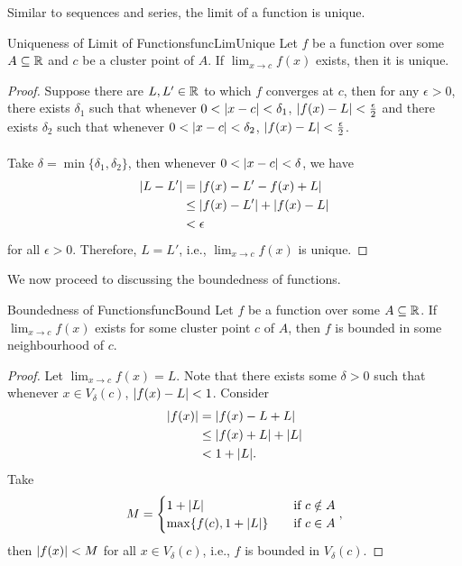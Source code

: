\documentclass[math]{amznotes}
\theoremstyle{remark}
\begin{document}
Similar to sequences and series, the limit of a function is unique.
\begin{thmbox}{Uniqueness of Limit of Functions}{funcLimUnique}
    Let $f$ be a function over some $A \subseteq \mathbb{R}$ and $c$ be a cluster point of $A$. If $\lim_{x \to c}f(x)$ exists, then it is unique.
    \tcblower
    \begin{proof}
        Suppose there are $L, L' \in \mathbb{R}$ to which $f$ converges at $c$, then for any $\epsilon > 0$, there exists $\delta_1$ such that whenever $0 < {\left\lvert {x - c} \right\rvert} < \delta_1$, ${\left\lvert {f(x) - L} \right\rvert} < \frac{\epsilon}{2}$ and there exists $\delta_2$ such that whenever $0 < {\left\lvert {x - c} \right\rvert} < \delta_2$, ${\left\lvert {f(x) - L} \right\rvert} < \frac{\epsilon}{2}$.
        \\\\
        Take $\delta = \min\{\delta_1, \delta_2\}$, then whenever $0 < {\left\lvert {x - c} \right\rvert} < \delta$, we have
        \begin{align*}
            {\left\lvert {L - L'} \right\rvert} & = {\left\lvert {f(x) - L' - f(x) + L} \right\rvert} \\
            & \leq {\left\lvert {f(x) - L'} \right\rvert} + {\left\lvert {f(x) - L} \right\rvert} \\
            & < \epsilon
        \end{align*}
        for all $\epsilon > 0$. Therefore, $L = L'$, i.e., $\lim_{x \to c}f(x)$ is unique.
    \end{proof}
\end{thmbox}
We now proceed to discussing the boundedness of functions.
\begin{thmbox}{Boundedness of Functions}{funcBound}
    Let $f$ be a function over some $A \subseteq \mathbb{R}$. If $\lim_{x \to c}f(x)$ exists for some cluster point $c$ of $A$, then $f$ is bounded in some neighbourhood of $c$.
    \tcblower
    \begin{proof}
        Let $\lim_{x \to c}f(x) = L$. Note that there exists some $\delta > 0$ such that whenever $x \in V_\delta(c)$, ${\left\lvert {f(x) - L} \right\rvert} < 1$. Consider
        \begin{align*}
            {\left\lvert {f(x)} \right\rvert} & = {\left\lvert {f(x) - L + L} \right\rvert} \\
            & \leq {\left\lvert {f(x) + L} \right\rvert} + {\left\lvert {L} \right\rvert} \\
            & < 1 + {\left\lvert {L} \right\rvert}.
        \end{align*}
        Take
        \begin{equation*}
            M = \begin{cases}
                1 + {\left\lvert {L} \right\rvert} & \quad \textrm{if } c \notin A \\
                \max\{f(c), 1 + {\left\lvert {L} \right\rvert}\} & \quad \textrm{if } c \in A
            \end{cases},
        \end{equation*}
        then ${\left\lvert {f(x)} \right\rvert} < M$ for all $x \in V_\delta(c)$, i.e., $f$ is bounded in $V_\delta(c)$.
    \end{proof}
\end{thmbox}
\end{document}
